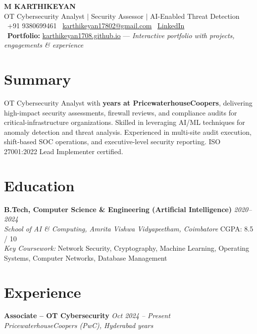 \documentclass[11pt,letterpaper]{article}
\begin{document}
\begin{center}
{\LARGE \textbf{M KARTHIKEYAN}}\\[4pt]
{\normalsize OT Cybersecurity Analyst \(\mid\) Security Assessor \(\mid\) AI-Enabled Threat Detection}\\[6pt]
\faPhone\ +91 9380699461 \quad
\faEnvelope\ \href{mailto:karthikeyan17802@gmail.com}{karthikeyan17802@gmail.com} \quad
\faLinkedin\ \href{https://www.linkedin.com/in/karthikeyan-m-10a35a242/}{LinkedIn}\\[4pt]
\faGlobe\ \textbf{Portfolio:} \href{https://karthikeyan1708.github.io}{\textcolor{linkblue}{karthikeyan1708.github.io}} --- \textit{Interactive portfolio with projects, engagements \& experience}
\end{center}

\section{Summary}
OT Cybersecurity Analyst with \textbf{ years at PricewaterhouseCoopers}, delivering high-impact security assessments, firewall reviews, and compliance audits for critical-infrastructure organizations. Skilled in leveraging AI/ML techniques for anomaly detection and threat analysis. Experienced in multi-site audit execution, shift-based SOC operations, and executive-level security reporting. ISO 27001:2022 Lead Implementer certified.

\section{Education}
\textbf{B.Tech, Computer Science \& Engineering (Artificial Intelligence)} \hfill \textit{2020--2024}\\
\textit{School of AI \& Computing, Amrita Vishwa Vidyapeetham, Coimbatore} \hfill CGPA: 8.5 / 10\\[2pt]
\textit{Key Coursework:} Network Security, Cryptography, Machine Learning, Operating Systems, Computer Networks, Database Management

\section{Experience}
\textbf{Associate -- OT Cybersecurity} \hfill \textit{Oct 2024 -- Present}\\
\textit{PricewaterhouseCoopers (PwC), Hyderabad} \hfill \textit{ years}
\end{document}
